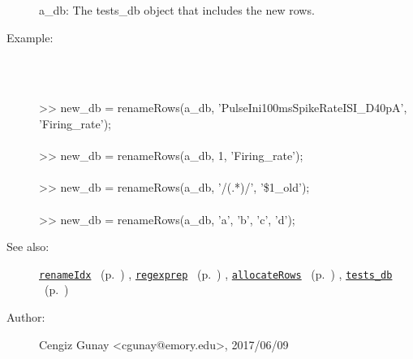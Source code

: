 \begin{description}
   a\_db: The tests\_db object that includes the new rows.
%
\item[Example:]~
\begin{lyxcode} %
\\%
 >> new\_db = renameRows(a\_db, 'PulseIni100msSpikeRateISI\_D40pA', 'Firing\_rate');
\\%
\\%
 >> new\_db = renameRows(a\_db, 1, 'Firing\_rate');
\\%
\\%
 >> new\_db = renameRows(a\_db, '/(.*)/', '\$1\_old');
\\%
\\%
 >> new\_db = renameRows(a\_db, {'a', 'b'}, {'c', 'd'});
\\%
\end{lyxcode}
%
\item[See also:]%
\hyperlink{ref_renameIdx}{\texttt{renameIdx}}%
\ (p.~\pageref{ref_renameIdx})%
%
, \hyperlink{ref_regexprep}{\texttt{regexprep}}%
\ (p.~\pageref{ref_regexprep})%
%
, \hyperlink{ref_allocateRows}{\texttt{allocateRows}}%
\ (p.~\pageref{ref_allocateRows})%
%
, \hyperlink{ref_tests_db}{\texttt{tests\_db}}%
\ (p.~\pageref{ref_tests_db})%
%
%
\item[Author:]%
Cengiz Gunay <cgunay@emory.edu>, 2017/06/09
%
\end{description}
\methodline%
